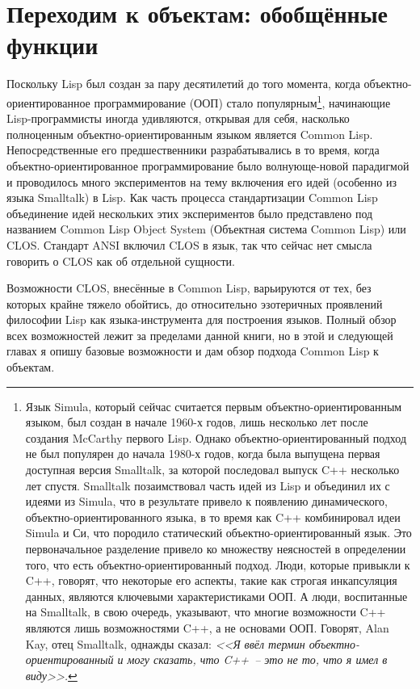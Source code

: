 \chapter{Переходим к объектам: обобщённые функции}
\label{ch:16}

\thispagestyle{empty}

Поскольку Lisp был создан за пару десятилетий до того момента, когда
объектно-ориентированное программирование (ООП) стало популярным\footnote{Язык Simula,
  который сейчас считается первым объектно-ориентированным языком, был создан в начале
  1960-х годов, лишь несколько лет после создания McCarthy первого Lisp.  Однако
  объектно-ориентированный подход не был популярен до начала 1980-х годов, когда была
  выпущена первая доступная версия Smalltalk, за которой последовал выпуск C++ несколько
  лет спустя.  Smalltalk позаимствовал часть идей из Lisp и объединил их с идеями из
  Simula, что в результате привело к появлению динамического, объектно-ориентированного
  языка, в то время как C++ комбинировал идеи Simula и Си, что породило статический
  объектно-ориентированный язык. Это первоначальное разделение привело ко множеству
  неясностей в определении того, что есть объектно-ориентированный подход.  Люди, которые
  привыкли к C++, говорят, что некоторые его аспекты, такие как строгая инкапсуляция
  данных, являются ключевыми характеристиками ООП. А люди, воспитанные на Smalltalk, в
  свою очередь, указывают, что многие возможности C++ являются лишь возможностями C++, а не
  основами ООП.  Говорят, Alan Kay, отец Smalltalk, однажды сказал: \textit{<<Я ввёл термин
    объектно-ориентированный и могу сказать, что C++~-- это не то, что я имел в виду>>.}},
начинающие Lisp-программисты иногда удивляются, открывая для себя, насколько полноценным
объектно-ориентированным языком является Common Lisp.  Непосредственные его
предшественники разрабатывались в то время, когда объектно-ориентированное
программирование было волнующе-новой парадигмой и проводилось много экспериментов на тему
включения его идей (особенно из языка Smalltalk) в Lisp.  Как часть процесса
стандартизации Common Lisp объединение идей нескольких этих экспериментов было
представлено под названием Common Lisp Object System (Объектная система Common Lisp) или
CLOS. Стандарт ANSI
включил CLOS в язык, так что сейчас нет смысла говорить о CLOS как об отдельной сущности.

Возможности CLOS, внесённые в Common Lisp, варьируются от тех, без которых крайне тяжело
обойтись, до относительно эзотеричных проявлений философии Lisp как языка-инструмента для
построения языков.  Полный обзор всех возможностей лежит за пределами данной книги, но в
этой и следующей главах я опишу базовые возможности и дам обзор подхода Common Lisp к
объектам.

